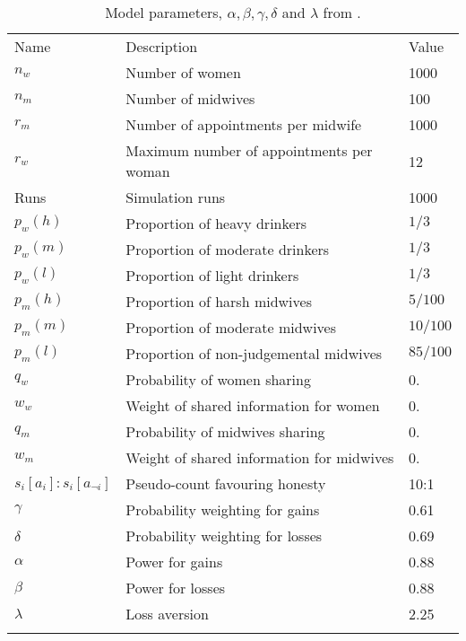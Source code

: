 \begin{table}[h!]
\caption[Midwives and women disclosure game model parameters]{Model parameters, $\alpha,\beta,\gamma,\delta$ and $\lambda$ from \cite[pp. 311--312]{Tversky1992}.} 
\label{tab:qt_params}
\begin{tabular} {lll}
\hline\noalign{\smallskip}
Name & Description & Value \\
\noalign{\smallskip}\svhline\noalign{\smallskip}
\(n_{w}\) & Number of women & 1000 \\ 
\(n_{m}\) & Number of midwives & 100 \\ 
\(r_{m}\) & Number of appointments per midwife & 1000 \\ 
\(r_{w}\) & Maximum number of appointments per woman & 12 \\ 
Runs & Simulation runs & 1000 \\ 
\(p_{w}(h)\) & Proportion of heavy drinkers & \(1/3\) \\ 
\(p_{w}(m)\) & Proportion of moderate drinkers & \(1/3\) \\ 
\(p_{w}(l)\) & Proportion of light drinkers & \(1/3\) \\ 
\(p_{m}(h)\) & Proportion of harsh midwives & \(5/100\) \\ 
\(p_{m}(m)\) & Proportion of moderate midwives & \(10/100\) \\ 
\(p_{m}(l)\) & Proportion of non-judgemental midwives & \(85/100\) \\ 
\(q_{w}\) & Probability of women sharing & 0. \\ 
\(w_{w}\) & Weight of shared information for women & 0. \\ 
\(q_{m}\) & Probability of midwives sharing & 0. \\ 
\(w_{m}\) & Weight of shared information for midwives & 0. \\ 
\(s_{i}[a_{i}]:s_{i}[a_{\neg i}]\) & Pseudo-count favouring honesty\footnotemark & 10:1 \\ 
\(\gamma\) & Probability weighting for gains  & 0.61 \\ 
\(\delta\) & Probability weighting for losses &  0.69\\ 
\(\alpha\) & Power for gains  & 0.88 \\ 
\(\beta\) & Power for losses & 0.88 \\ 
\(\lambda\) & Loss aversion &  2.25 \\
\noalign{\smallskip}\hline\noalign{\smallskip}
\end{tabular}
\end{table}

